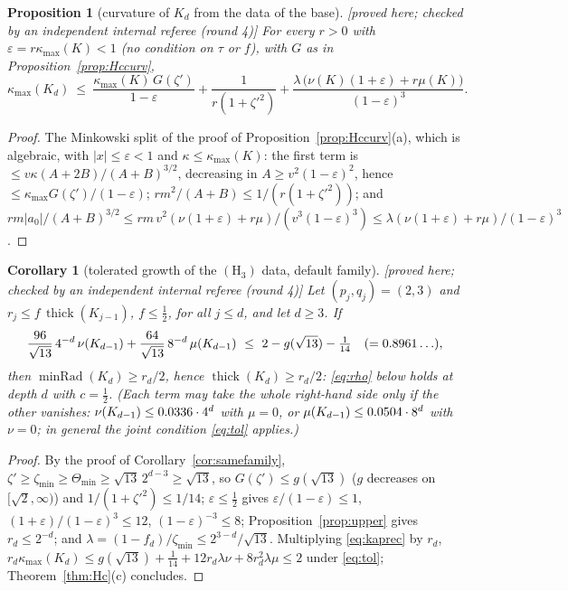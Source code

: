 \documentclass[10pt,a4paper]{article}
\theoremstyle{plain}
\newtheorem{proposition}[theorem]{Proposition}
\newtheorem{corollary}[theorem]{Corollary}
\theoremstyle{definition}
\theoremstyle{remark}
\newcommand{\thick}{\operatorname{thick}}
\newcommand{\minRad}{\operatorname{minRad}}
\newcommand{\status}[1]{\textsf{\small [#1]}}
\begin{document}
\begin{proposition}[curvature of $K_d$ from the data of the base]\label{prop:curvrec}\status{proved here; checked by an independent internal referee (round 4)}
For every $r>0$ with $\varepsilon=r\kappa_{\max}(K)<1$ (no condition on $\tau$ or $f$), with $G$ as in Proposition~\ref{prop:Hccurv},
\begin{equation}\label{eq:kaprec}
\kappa_{\max}(K_d)\ \le\ \frac{\kappa_{\max}(K)\,G(\zeta')}{1-\varepsilon}+\frac1{r(1+\zeta'^2)}+\frac{\lambda\,\bigl(\nu(K)(1+\varepsilon)+r\mu(K)\bigr)}{(1-\varepsilon)^3}.
\end{equation}
\end{proposition}
\begin{proof}
The Minkowski split of the proof of Proposition~\ref{prop:Hccurv}(a), which is algebraic, with $|x|\le\varepsilon<1$ and $\kappa\le\kappa_{\max}(K)$: the first term is $\le v\kappa(A+2B)/(A+B)^{3/2}$, decreasing in $A\ge v^2(1-\varepsilon)^2$, hence $\le\kappa_{\max}G(\zeta')/(1-\varepsilon)$; $rm^2/(A+B)\le1/(r(1+\zeta'^2))$; and $rm|a_0|/(A+B)^{3/2}\le rm\,v^2(\nu(1+\varepsilon)+r\mu)/(v^3(1-\varepsilon)^3)\le\lambda(\nu(1+\varepsilon)+r\mu)/(1-\varepsilon)^3$.
\end{proof}

\begin{corollary}[tolerated growth of the $(\mathrm H_3)$ data, default family]\label{cor:tolerance}\status{proved here; checked by an independent internal referee (round 4)}
Let $(p_j,q_j)=(2,3)$ and $r_j\le f\,\thick(K_{j-1})$, $f\le\frac12$, for all $j\le d$, and let $d\ge3$. If
\begin{equation}\label{eq:tol}
\frac{96}{\sqrt{13}}\,4^{-d}\,\nu(K_{d-1})+\frac{64}{\sqrt{13}}\,8^{-d}\,\mu(K_{d-1})\ \le\ 2-g(\sqrt{13})-\tfrac1{14}\quad(=\HthreeTolRHS\ldots),
\end{equation}
then $\minRad(K_d)\ge r_d/2$, hence $\thick(K_d)\ge r_d/2$: \eqref{eq:rho} below holds at depth $d$ with $c=\frac12$. (Each term may take the whole right-hand side only if the other vanishes: $\nu(K_{d-1})\le0.0336\cdot4^d$ with $\mu=0$, or $\mu(K_{d-1})\le0.0504\cdot8^d$ with $\nu=0$; in general the joint condition \eqref{eq:tol} applies.)
\end{corollary}
\begin{proof}
By the proof of Corollary~\ref{cor:samefamily}, $\zeta'\ge\zeta_{\min}\ge\Theta_{\min}\ge\sqrt{13}\,2^{d-3}\ge\sqrt{13}$, so $G(\zeta')\le g(\sqrt{13})$ ($g$ decreases on $[\sqrt2,\infty)$) and $1/(1+\zeta'^2)\le1/14$; $\varepsilon\le\frac12$ gives $\varepsilon/(1-\varepsilon)\le1$, $(1+\varepsilon)/(1-\varepsilon)^3\le12$, $(1-\varepsilon)^{-3}\le8$; Proposition~\ref{prop:upper} gives $r_d\le2^{-d}$; and $\lambda=(1-f_d)/\zeta_{\min}\le2^{3-d}/\sqrt{13}$. Multiplying \eqref{eq:kaprec} by $r_d$, $r_d\kappa_{\max}(K_d)\le g(\sqrt{13})+\frac1{14}+12r_d\lambda\nu+8r_d^2\lambda\mu\le2$ under \eqref{eq:tol}; Theorem~\ref{thm:Hc}(c) concludes.
\end{proof}
\end{document}
